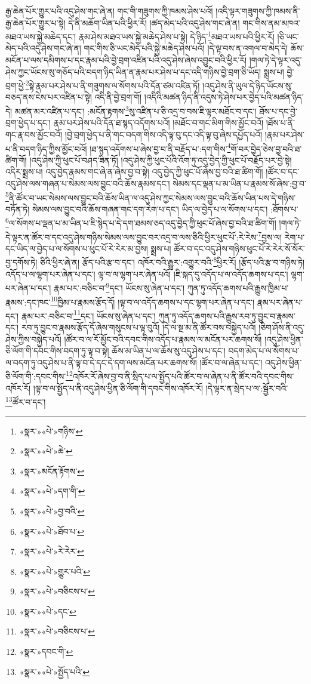 རྒྱ་ཆེན་པོར་གྱུར་པའི་འདུ་ཤེས་གང་ཞེ་ན། གང་གི་གཟུགས་ཀྱི་ཁམས་ཤེས་པའོ། །འདི་ལྟར་གཟུགས་ཀྱི་ཁམས་ནི་རྒྱ་ཆེན་པོར་གྱུར་པ་སྟེ། དེ་ནི་མཆོག་ཡིན་པའི་ཕྱིར་རོ། །ཚད་མེད་པའི་འདུ་ཤེས་གང་ཞེ་ན། གང་གིས་ནམ་མཁའ་མཐའ་ཡས་སྐྱེ་མཆེད་དང་། རྣམ་ཤེས་མཐའ་ཡས་སྐྱེ་མཆེད་ཤེས་པ་སྟེ། དེ་ཉིད་\footnote{«སྣར་»«པེ་»གཉིས་}མཐའ་ཡས་པའི་ཕྱིར་རོ། །ཅི་ཡང་མེད་པའི་འདུ་ཤེས་གང་ཞེ་ན། གང་གིས་ཅི་ཡང་མེད་པའི་སྐྱེ་མཆེད་ཤེས་པའོ། །དེ་ལྟ་བས་ན་འགལ་བ་མེད་དེ། ཆོས་མངོན་པ་ལས་དམིགས་པ་དང་རྣམ་པའི་བྱེ་བྲག་འཛིན་པའི་འདུ་ཤེས་ཞེས་འབྱུང་བའི་ཕྱིར་རོ། །གལ་ཏེ་དེ་ལྟར་འདུ་ཤེས་ཀྱང་ཡོངས་སུ་གཅོད་པའི་བདག་ཉིད་ཡིན་ན་རྣམ་པར་ཤེས་པ་དང་འདི་གཉིས་བྱེ་བྲག་ཅི་ཡོད། སྨྲས་པ། བྱེ་བྲག་ཕྱེ་\footnote{«སྣར་»«པེ་»ཆེ་}སྟེ་རྣམ་པར་ཤེས་པ་ནི་གཟུགས་ལ་སོགས་པའི་དོན་ཙམ་འཛིན་ཏོ། །འདུ་ཤེས་ནི་ཡུལ་དེ་ཉིད་ཡོངས་སུ་བཅད་ནས་ངེས་པར་འཛིན་པ་སྟེ། འདི་ནི་བྱེ་བྲག་གོ། །འདིའི་མཚན་ཉིད་ནི་འདུས་ཏེ་ཤེས་པར་བྱེད་པའི་མཚན་ཉིད་དེ། མཚན་མར་འཛིན་པ་དང་། :མངོན་རྟགས་\footnote{«སྣར་»མངོན་རྟོགས་}སུ་འཛིན་པ་ཅི་འདྲ་བ་བས་ཇི་ལྟར་མཐོང་བ་དང་། ཐོས་པ་དང་བྱེ་བྲག་ཕྱེད་པ་དང་། རྣམ་པར་ཤེས་པའི་དོན་ཐ་སྙད་འདོགས་པའོ། །མཐོང་བ་གང་མིག་གིས་མྱོང་བའོ། །ཐོས་པ་ནི་གང་རྣ་བས་མྱོང་བའོ། །བྱེ་བྲག་ཕྱེད་པ་ནི་གང་བདག་གིས་འདི་ལྟ་བུ་དང་འདི་ལྟ་བུ་ཞེས་དཔྱོད་པའོ། །རྣམ་པར་ཤེས་པ་ནི་བདག་ཉིད་ཀྱིས་མྱོང་བའོ། །ཐ་སྙད་འདོགས་པ་ཞེས་བྱ་བ་ནི་བརྗོད་པ་:དག་གིས་\footnote{«སྣར་»«པེ་»དག་གི་}གོ་བར་བྱེད་ཅེས་བྱ་བའི་ཐ་ཚིག་གོ། །འདུ་ཤེས་ཀྱི་ཕུང་པོ་བཤད་ཟིན་ཏོ། །འདུ་ཤེས་ཀྱི་ཕུང་པོའི་འོག་ཏུ་འདུ་བྱེད་ཀྱི་ཕུང་པོ་བརྗོད་པར་བྱེ་སྟེ། འདིར་སྨྲས་པ། འདུ་བྱེད་རྣམས་གང་ཞེ་ན་ཞེས་བྱ་བ་སྟེ། འདུ་བྱེད་ཀྱི་ཕུང་པོ་ཞེས་བྱ་བའི་ཐ་ཚིག་གོ། །ཚོར་བ་དང་འདུ་ཤེས་ལས་གཞན་པ་སེམས་ལས་བྱུང་བའི་ཆོས་རྣམས་དང་། སེམས་དང་ལྡན་པ་མ་ཡིན་པ་རྣམས་སོ་ཞེས་:བྱ་བ་\footnote{«སྣར་»«པེ་»བྱ་བའི་}ནི་ཚོར་བ་ཡང་སེམས་ལས་བྱུང་བའི་ཆོས་ཡིན་ལ་འདུ་ཤེས་ཀྱང་སེམས་ལས་བྱུང་བའི་ཆོས་ཡིན་པས་དེ་གཉིས་བཏོན་ཏེ། སེམས་ལས་བྱུང་བའི་ཆོས་གཞན་གང་དག་རེག་པ་དང་། ཡིད་ལ་བྱེད་པ་ལ་སོགས་པ་དང་། :ཐོགས་པ་\footnote{«སྣར་»«པེ་»ཐོབ་པ་}ལ་སོགས་པ་ལྡན་པ་མ་ཡིན་པ་ཇི་སྙེད་པ་དེ་དག་ཐམས་ཅད་འདུ་བྱེད་ཀྱི་ཕུང་པོ་ཞེས་བྱ་བའི་ཐ་ཚིག་གོ། །གལ་ཏེ་དེ་ལྟར་ན་ཚོར་བ་དང་འདུ་ཤེས་གཉིས་སེམས་ལས་བྱུང་བར་འདྲ་བ་ལས་ཅིའི་ཕྱིར་ཕུང་པོ་:རེ་རེས་\footnote{«སྣར་»«པེ་»རེ་རེར་}བྱས་ལ། རེག་པ་དང་ཡིད་ལ་བྱེད་པ་ལ་སོགས་པ་ཕུང་པོ་རེ་རེར་མ་བྱས། སྨྲས་པ། ཚོར་བ་དང་འདུ་ཤེས་གཉིས་ཕུང་པོ་རེ་རེར་སོ་སོར་བྱ་དགོས་ཏེ། ཅིའི་ཕྱིར་ཞེ་ན། རྩོད་པའི་རྩ་བ་དང་། འཁོར་བའི་རྒྱུར་:འགྱུར་བའི་\footnote{«སྣར་»«པེ་»གྱུར་པའི་}ཕྱིར་རོ། །རྩོད་པའི་རྩ་བ་གཉིས་ཏེ། འདོད་པ་ལ་ལྷག་པར་ཞེན་པ་དང་། ལྟ་བ་ལ་ལྷག་པར་ཞེན་པའོ། །ཇི་སྐད་དུ་འདོད་པ་ལ་འདོད་ཆགས་པ་དང་། ལྷག་པར་ཞེན་པ་དང་། རྣམ་པར་:བཅིང་བ་\footnote{«སྣར་»«པེ་»བཅིངས་པ་}དང་། ཡོངས་སུ་ཞེན་པ་དང་། ཀུན་ཏུ་འདོད་ཆགས་པའི་རྒྱུས་ཁྱིམ་པ་རྣམས་:དང་ཁང་\footnote{«སྣར་»«པེ་»དང་}ཁྱིམ་པ་རྣམས་རྩོད་དོ། །ལྟ་བ་ལ་འདོད་ཆགས་པ་དང་ལྷག་པར་ཞེན་པ་དང་། རྣམ་པར་ཞེན་པ་དང་། རྣམ་པར་:བཅིང་བ་\footnote{«སྣར་»«པེ་»བཅིངས་པ་}དང་། ཡོངས་སུ་ཞེན་པ་དང་། ཀུན་ཏུ་འདོད་ཆགས་པའི་རྒྱུས་རབ་ཏུ་བྱུང་བ་རྣམས་དང་། རབ་ཏུ་བྱུང་བ་རྣམས་རྩོད་དོ་ཞེས་གསུངས་པ་ལྟ་བུའོ། །དེ་ལ་སྔ་མ་ནི་ཚོར་བས་བསྐྱེད་པའོ། །ཅིག་ཤོས་ནི་འདུ་ཤེས་ཀྱིས་བསྐྱེད་པའོ། །ཚོར་བ་ལ་རོ་མྱོང་བའི་དབང་གིས་འདོད་པ་རྣམས་ལ་མངོན་པར་ཆགས་སོ། །འདུ་ཤེས་ཕྱིན་ཅི་ལོག་གི་དབང་གིས་བདག་ཏུ་ལྟ་བ་སྟེ། ཆོས་མ་ཡིན་པ་ལ་ཆོས་སུ་འདུ་ཤེས་པ་དང་། བདག་མེད་པ་ལ་སོགས་པ་ལ་བདག་ཏུ་འདུ་ཤེས་པ་ནི་ལྟ་བ་དེ་དང་དེ་དག་ལས་མངོན་པར་ཆགས་སོ། །ཚོར་བ་ལ་ཞེན་པ་དང་། འདུ་ཤེས་ཕྱིན་ཅི་ལོག་གི་:དབང་གིས་\footnote{«སྣར་»དབང་གི་}འཁོར་རོ་ཞེས་བྱ་བ་ནི་སྲིད་པ་ལ་སྤྱོད་པའི་ཚོར་བ་ལ་ཞེན་པ་ནི་ཚོར་བའི་དབང་གིས་འཁོར་རོ། །ལྟ་བ་ལ་སྤྱོད་པ་ནི་འདུ་ཤེས་ཕྱིན་ཅི་ལོག་གི་དབང་གིས་འཁོར་རོ། །དེ་ལྟར་ན་སྲེད་པ་ལ་:སྦྱོར་བའི་\footnote{«སྣར་»«པེ་»སྤྱོད་པའི་}ཚོར་བ་དང་། 